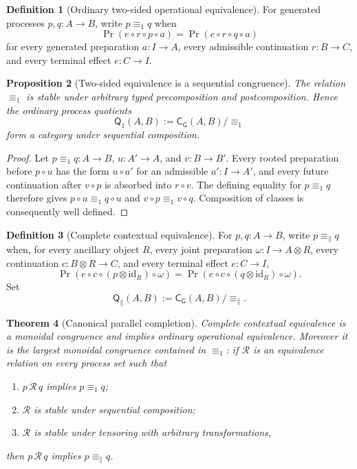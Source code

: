 \documentclass[11pt]{article}
\newtheorem{theorem}{Theorem}[section]
\newtheorem{proposition}[theorem]{Proposition}
\theoremstyle{definition}
\newtheorem{definition}[theorem]{Definition}
\theoremstyle{remark}
\newcommand{\id}{\mathrm{id}}
\newcommand{\Qq}{\mathsf Q}
\begin{document}
\begin{definition}[Ordinary two-sided operational equivalence]
\label{def:two-sided-equivalence}
For generated processes $p,q:A\to B$, write $p\equiv_1q$ when
\[
 \Pr(e\circ r\circ p\circ a)
 =\Pr(e\circ r\circ q\circ a)
\]
for every generated preparation $a:I\to A$, every admissible continuation
$r:B\to C$, and every terminal effect $e:C\to I$.
\end{definition}

\begin{proposition}[Two-sided equivalence is a sequential congruence]
\label{prop:two-sided-congruence}
The relation $\equiv_1$ is stable under arbitrary typed precomposition and
postcomposition.  Hence the ordinary process quotients
\[
 \Qq_1(A,B):=\mathsf C_{\mathsf G}(A,B)/{\equiv_1}
\]
form a category under sequential composition.
\end{proposition}

\begin{proof}
Let $p\equiv_1q:A\to B$, $u:A'\to A$, and $v:B\to B'$.  Every rooted
preparation before $p\circ u$ has the form $u\circ a'$ for an admissible
$a':I\to A'$, and every future continuation after $v\circ p$ is absorbed into
$r\circ v$.  The defining equality for $p\equiv_1q$ therefore gives
$p\circ u\equiv_1q\circ u$ and $v\circ p\equiv_1v\circ q$.  Composition of
classes is consequently well defined.
\end{proof}

\begin{definition}[Complete contextual equivalence]
\label{def:complete-equivalence}
For $p,q:A\to B$, write $p\equiv_{\parallel}q$ when, for every ancillary object
$R$, every joint preparation $\omega:I\to A\otimes R$, every continuation
$c:B\otimes R\to C$, and every terminal effect $e:C\to I$,
\[
 \Pr\!\left(e\circ c\circ(p\otimes\id_R)\circ\omega\right)
 =
 \Pr\!\left(e\circ c\circ(q\otimes\id_R)\circ\omega\right).
\]
Set
\[
 \Qq_{\parallel}(A,B)
 :=\mathsf C_{\mathsf G}(A,B)/{\equiv_{\parallel}}.
\]
\end{definition}

\begin{theorem}[Canonical parallel completion]
\label{thm:parallel-completion}
Complete contextual equivalence is a monoidal congruence and implies ordinary
operational equivalence.  Moreover it is the largest monoidal congruence
contained in $\equiv_1$: if $\mathcal R$ is an equivalence relation on every
process set such that
\begin{enumerate}[label=\textup{(\alph*)},leftmargin=2.4em]
\item $p\,\mathcal R\,q$ implies $p\equiv_1q$;
\item $\mathcal R$ is stable under sequential composition;
\item $\mathcal R$ is stable under tensoring with arbitrary transformations,
\end{enumerate}
then $p\,\mathcal R\,q$ implies $p\equiv_{\parallel}q$.
\end{theorem}
\end{document}
